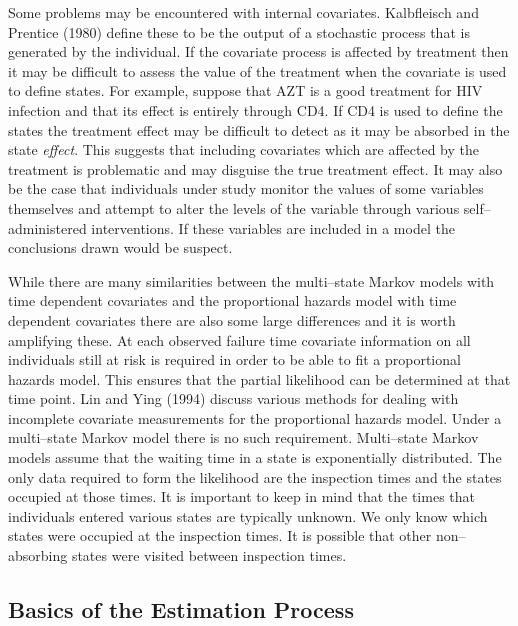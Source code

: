 \documentclass[12pt]{article}
\begin{document}
Some problems may be encountered with internal covariates. 
Kalbfleisch and Prentice (1980) define these to be the output of a stochastic
process that is generated by the individual.
If the covariate process is affected by
treatment then it may be difficult to assess the value of the treatment when
the covariate is used to define states.
For example, 
suppose that AZT is a good treatment for HIV infection and that its effect
is entirely through CD4. 
If CD4 is used to define the states the treatment effect may be difficult
to detect as it may be absorbed in the state {\em effect}.
This suggests that including covariates which are affected by the
treatment is problematic and may disguise the true treatment effect.
It may also be the case that individuals under study monitor the values of some
variables themselves and attempt to alter the levels of the variable through various 
self--administered interventions.
If these variables are included in a model the conclusions drawn
would be suspect.

While there are many similarities between the multi--state Markov models with time dependent
covariates and the proportional hazards model with time dependent covariates there are also
some large differences and it is worth amplifying these.
At each observed failure time covariate information on all individuals
still at risk is required in order to be able to fit a proportional hazards model.
This ensures that the partial likelihood can be determined at that time
point.
Lin and Ying (1994) discuss various methods for dealing with incomplete covariate
measurements for the proportional hazards model.
Under a multi--state Markov model there is no such requirement.
Multi--state Markov models assume that the waiting time in a state is exponentially distributed.
The only data required to form the likelihood are the inspection times and the 
states occupied at those times. 
It is important to keep in mind that the times that individuals entered
various states are typically unknown.
We only know which states were occupied at the inspection times.
It is possible that other non--absorbing states were visited between inspection
times.

\subsection{Basics of the Estimation Process}
\end{document}
